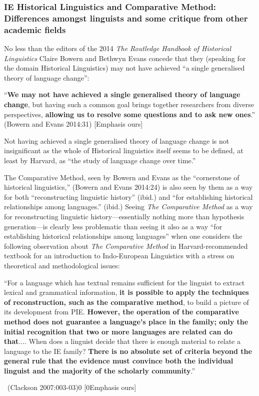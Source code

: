 \subsubsection{IE Historical Linguistics and Comparative Method: Differences amongst linguists and some critique from other academic fields}

No less than the editors of the 2014 \textit{The Routledge Handbook of Historical Linguistics} Claire Bowern and Bethwyn Evans concede that they (speaking for the domain Historical Linguistics) may not have achieved “a single generalised theory of language change”:

\begin{myquote}
“\textbf{We may not have achieved a single generalised theory of language change}, but having such a common goal brings together researchers from diverse perspectives, \textbf{allowing us to resolve some questions and to ask new ones}.” \hfill (Bowern and Evans 2014:31) [Emphasis ours]
\end{myquote}

Not having achieved a single generalised theory of language change is not insignificant as the whole of Historical linguistics itself seems to be defined, at least by Harvard, as “the study of language change over time.”

The Comparative Method, seen by Bowern and Evans as the “cornerstone of historical linguistics,” (Bowern and Evans 2014:24) is also seen by them as a way for both “reconstructing linguistic history” (ibid.) and “for establishing historical relationships among languages.” (ibid.) Seeing \textit{The Comparative Method} as a way for reconstructing linguistic history—essentially nothing more than hypothesis generation—is clearly less problematic than seeing it also as a way “for establishing historical relationships among languages” when one considers the following observation about \textit{The Comparative Method} in Harvard-recommended textbook for an introduction to Indo-European Linguistics with a stress on theoretical and methodological issues:

\begin{myquote}
“For a language which has textual remains sufficient for the linguist to extract lexical and grammatical information, \textbf{it is possible to apply the techniques of reconstruction, such as the comparative method}, to build a picture of its development from PIE. \textbf{However, the operation of the comparative method does not guarantee a language’s place in the family; only the initial recognition that two or more languages are related can do that}.... When does a linguist decide that there is enough material to relate a language to the IE family? \textbf{There is no absolute set of criteria beyond the general rule that the evidence must convince both the individual linguist and the majority of the scholarly community}.” 

~\hfill (Clackson 2007:003-03)0 [0Emphasis ours]
\end{myquote}

